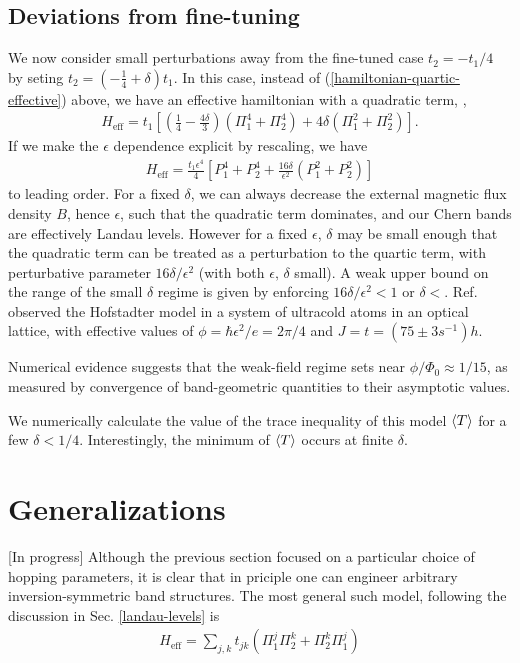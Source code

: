\documentclass[aps,prb,twocolumn,letterpaper,twoside,nobalancelastpage,groupedaddress,amsmath,amssymb,floatfix,citeautoscript]{revtex4-1}
\begin{document}
\subsection{Deviations from fine-tuning}
We now consider small perturbations away from the fine-tuned case $t_2 = -t_1/4$ by seting $t_2 = \left(-\frac{1}{4} + \delta\right)t_1$. In this case, instead of (\ref{hamiltonian-quartic-effective}) above, we have an effective hamiltonian with a quadratic term, ,
\begin{align*}
H_{\text{eff}} = t_1 \left[\left(\frac{1}{4}-\frac{4\delta}{3}\right)\left(\Pi_1^4 + \Pi_2^4\right) + 4\delta \left(\Pi_1^2 + \Pi_2^2\right)\right].
\end{align*}
If we make the $\epsilon$ dependence explicit by rescaling, we have
\begin{align*}
H_{\text{eff}} = \frac{t_1\epsilon^4}{4} \left[P_1^4 + P_2^4 + \frac{16\delta}{\epsilon^2} \left(P_1^2 + P_2^2\right)\right]
\end{align*}
to leading order. For a fixed $\delta$, we can always decrease the external magnetic flux density $B$, hence $\epsilon$, such that the quadratic term dominates, and our Chern bands are effectively Landau levels. However for a fixed $\epsilon$, $\delta$ may be small enough that the quadratic term can be treated as a perturbation to the quartic term, with perturbative parameter $16 \delta/\epsilon^2$ (with both $\epsilon,\,\delta$ small). A weak upper bound on the range of the small $\delta$ regime is given by enforcing $16 \delta/\epsilon^2 < 1$ or $\delta < $. Ref.  observed the Hofstadter model in a system of ultracold atoms in an optical lattice, with effective values of $\phi = \hbar\epsilon^2/e = 2\pi/4$ and $J = t = (75\pm3s^{-1})h$. 

Numerical evidence suggests that the weak-field regime sets near $\phi/\Phi_0 \approx 1/15$, as measured by convergence of band-geometric quantities to their asymptotic values\cite{Bauer2016}.

We numerically calculate the value of the trace inequality of this model $\expval{T}$ for a few $\delta < 1/4$. Interestingly, the minimum of $\expval{T}$ occurs at finite $\delta$.

\section{Generalizations}
[In progress]
Although the previous section focused on a particular choice of hopping parameters, it is clear that in priciple one can engineer arbitrary inversion-symmetric band structures. The most general such model, following the discussion in Sec. \ref{landau-levels} is
\begin{align*}
H_{\text{eff}} = \sum_{j,k}t_{jk}\left(\Pi_1^{j}\Pi_2^{k} + \Pi_2^{k}\Pi_1^{j}\right)
\end{align*}
\end{document}
